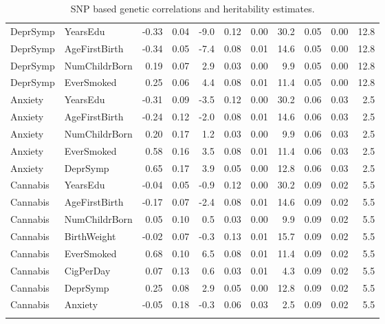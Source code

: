 \begin{longtable}{llrrrrrrrrr}
  DeprSymp & YearsEdu & -0.33 & 0.04 & -9.0 & 0.12 & 0.00 & 30.2 & 0.05 & 0.00 & 12.8 \\ 
  DeprSymp & AgeFirstBirth & -0.34 & 0.05 & -7.4 & 0.08 & 0.01 & 14.6 & 0.05 & 0.00 & 12.8 \\ 
  DeprSymp & NumChildrBorn & 0.19 & 0.07 & 2.9 & 0.03 & 0.00 & 9.9 & 0.05 & 0.00 & 12.8 \\ 
  DeprSymp & EverSmoked & 0.25 & 0.06 & 4.4 & 0.08 & 0.01 & 11.4 & 0.05 & 0.00 & 12.8 \\ 
  Anxiety & YearsEdu & -0.31 & 0.09 & -3.5 & 0.12 & 0.00 & 30.2 & 0.06 & 0.03 & 2.5 \\ 
  Anxiety & AgeFirstBirth & -0.24 & 0.12 & -2.0 & 0.08 & 0.01 & 14.6 & 0.06 & 0.03 & 2.5 \\ 
  Anxiety & NumChildrBorn & 0.20 & 0.17 & 1.2 & 0.03 & 0.00 & 9.9 & 0.06 & 0.03 & 2.5 \\ 
  Anxiety & EverSmoked & 0.58 & 0.16 & 3.5 & 0.08 & 0.01 & 11.4 & 0.06 & 0.03 & 2.5 \\ 
  Anxiety & DeprSymp & 0.65 & 0.17 & 3.9 & 0.05 & 0.00 & 12.8 & 0.06 & 0.03 & 2.5 \\ 
  Cannabis & YearsEdu & -0.04 & 0.05 & -0.9 & 0.12 & 0.00 & 30.2 & 0.09 & 0.02 & 5.5 \\ 
  Cannabis & AgeFirstBirth & -0.17 & 0.07 & -2.4 & 0.08 & 0.01 & 14.6 & 0.09 & 0.02 & 5.5 \\ 
  Cannabis & NumChildrBorn & 0.05 & 0.10 & 0.5 & 0.03 & 0.00 & 9.9 & 0.09 & 0.02 & 5.5 \\ 
  Cannabis & BirthWeight & -0.02 & 0.07 & -0.3 & 0.13 & 0.01 & 15.7 & 0.09 & 0.02 & 5.5 \\ 
  Cannabis & EverSmoked & 0.68 & 0.10 & 6.5 & 0.08 & 0.01 & 11.4 & 0.09 & 0.02 & 5.5 \\ 
  Cannabis & CigPerDay & 0.07 & 0.13 & 0.6 & 0.03 & 0.01 & 4.3 & 0.09 & 0.02 & 5.5 \\ 
  Cannabis & DeprSymp & 0.25 & 0.08 & 2.9 & 0.05 & 0.00 & 12.8 & 0.09 & 0.02 & 5.5 \\ 
  Cannabis & Anxiety & -0.05 & 0.18 & -0.3 & 0.06 & 0.03 & 2.5 & 0.09 & 0.02 & 5.5 \\ 
  \hline
\caption{SNP based genetic correlations and heritability estimates.} 
\label{tab:rg}
\end{longtable}
